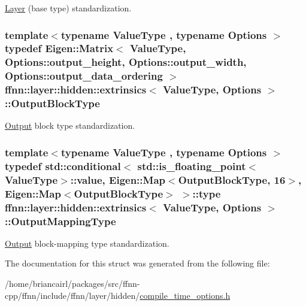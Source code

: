 \hyperlink{classffnn_1_1layer_1_1_layer}{Layer} (base type) standardization. 

\hypertarget{structffnn_1_1layer_1_1hidden_1_1extrinsics_ac5ca721e2e5843ddcf90351b59c4e56e}{
\subsubsection[{Output\-Block\-Type}]{\setlength{\rightskip}{0pt plus 5cm}template$<$typename Value\-Type , typename Options $>$ typedef Eigen\-::\-Matrix$<$ Value\-Type, Options\-::output\-\_\-height, Options\-::output\-\_\-width, Options\-::output\-\_\-data\-\_\-ordering $>$ {\bf ffnn\-::layer\-::hidden\-::extrinsics}$<$ Value\-Type, Options $>$\-::{\bf Output\-Block\-Type}}}\label{structffnn_1_1layer_1_1hidden_1_1extrinsics_ac5ca721e2e5843ddcf90351b59c4e56e}


\hyperlink{classffnn_1_1layer_1_1_output}{Output} block type standardization. 

\hypertarget{structffnn_1_1layer_1_1hidden_1_1extrinsics_a886b2e28314f8641f14407a84af8132c}{
\subsubsection[{Output\-Mapping\-Type}]{\setlength{\rightskip}{0pt plus 5cm}template$<$typename Value\-Type , typename Options $>$ typedef std\-::conditional$<$ std\-::is\-\_\-floating\-\_\-point$<$Value\-Type$>$\-::value, Eigen\-::\-Map$<${\bf Output\-Block\-Type}, 16$>$, Eigen\-::\-Map$<${\bf Output\-Block\-Type}$>$ $>$\-::type {\bf ffnn\-::layer\-::hidden\-::extrinsics}$<$ Value\-Type, Options $>$\-::{\bf Output\-Mapping\-Type}}}\label{structffnn_1_1layer_1_1hidden_1_1extrinsics_a886b2e28314f8641f14407a84af8132c}


\hyperlink{classffnn_1_1layer_1_1_output}{Output} block-\/mapping type standardization. 



The documentation for this struct was generated from the following file\-:\begin{DoxyCompactItemize}
\item 
/home/briancairl/packages/src/ffnn-\/cpp/ffnn/include/ffnn/layer/hidden/\hyperlink{hidden_2compile__time__options_8h}{compile\-\_\-time\-\_\-options.\-h}\end{DoxyCompactItemize}
